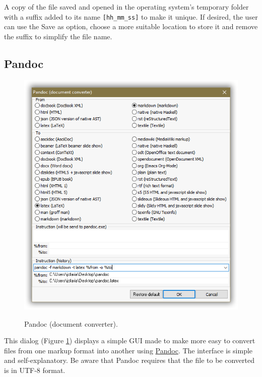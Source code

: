 A copy of the file saved and opened in the operating system's temporary folder
with a suffix added to its name \texttt{[hh\_mm\_ss]} to make it unique. If desired,
the user can use the Save as option, choose a more suitable location to
store it and remove the suffix to simplify the file name.


\hypertarget{dlg_working_pandoc}{}
\subsection{Pandoc}

\begin{figure}[H]
  \includegraphics[scale=0.8]{./res/pandoc.png} \\
  \caption{Pandoc (document converter).}
  \label{fig:dlg_pandoc}
\end{figure}
This dialog
(Figure \ref{fig:dlg_pandoc})
displays a simple GUI made to make more easy to convert files from one markup format into another using
\href{https://pandoc.org/index.html}{Pandoc}. The interface is simple and self-explanatory.
Be aware that Pandoc requires that the file to be converted is in UTF-8 format.


